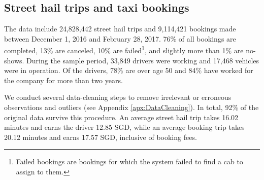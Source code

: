 \documentclass[reviewmode,AEJ]{AEA}
\begin{document}
\subsection{Street hail trips and taxi bookings}
The data include 24,828,442 street hail trips and 9,114,421 bookings made between December 1, 2016 and
February 28, 2017. 76\% of all bookings are 
completed, 13\% are canceled, 10\% are failed\footnote{Failed bookings are bookings for which the system failed to find a cab to assign to them.}, and slightly more than 1\% are no-shows.
During the sample period, 33,849 drivers were working and 17,468 vehicles were in operation.
Of the drivers, %
78\% are over age 50 and 84\% have worked for the company for more than two years.

We conduct several data-cleaning steps to remove irrelevant or erroneous observations and outliers (see Appendix \ref{apx:DataCleaning}).
In total, 92\% of the original data survive this procedure. %
An average street hail trip takes 16.02 minutes and earns the driver 12.85 SGD, while an average  
booking trip takes 20.12 minutes and earns 17.57 SGD, inclusive of booking fees.
\end{document}
